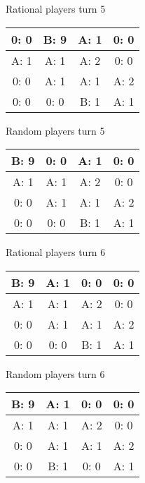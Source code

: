 \documentclass[12pt]{article}
\begin{document}
Rational players turn 5
\begin{center}
\begin{tabular}{|c|c|c|c|}
\hline
0: 0  & B: 9  & A: 1  & 0: 0  \\ \hline
A: 1  & A: 1  & A: 2  & 0: 0  \\ \hline
0: 0  & A: 1  & A: 1  & A: 2  \\ \hline
0: 0  & 0: 0  & B: 1  & A: 1  \\ \hline
\end{tabular}
\end{center}
Random players turn 5
\begin{center}
\begin{tabular}{|c|c|c|c|}
\hline
B: 9  & 0: 0  & A: 1  & 0: 0  \\ \hline
A: 1  & A: 1  & A: 2  & 0: 0  \\ \hline
0: 0  & A: 1  & A: 1  & A: 2  \\ \hline
0: 0  & 0: 0  & B: 1  & A: 1  \\ \hline
\end{tabular}
\end{center}

Rational players turn 6
\begin{center}
\begin{tabular}{|c|c|c|c|}
\hline
B: 9  & A: 1  & 0: 0  & 0: 0  \\ \hline
A: 1  & A: 1  & A: 2  & 0: 0  \\ \hline
0: 0  & A: 1  & A: 1  & A: 2  \\ \hline
0: 0  & 0: 0  & B: 1  & A: 1  \\ \hline
\end{tabular}
\end{center}
Random players turn 6
\begin{center}
\begin{tabular}{|c|c|c|c|}
\hline
B: 9  & A: 1  & 0: 0  & 0: 0  \\ \hline
A: 1  & A: 1  & A: 2  & 0: 0  \\ \hline
0: 0  & A: 1  & A: 1  & A: 2  \\ \hline
0: 0  & B: 1  & 0: 0  & A: 1  \\ \hline
\end{tabular}
\end{center}
\end{document}
